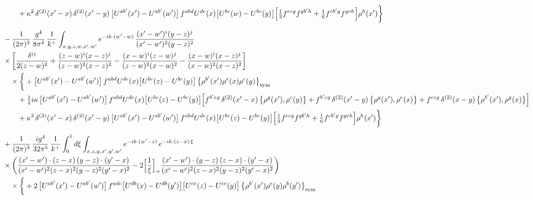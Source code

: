 \documentclass[10pt]{article}
\numberwithin{equation}{section}
\begin{document}
\begin{align}
&\qquad+\kappa^{2}\,\delta^{(2)}(x^{\prime}-x)\,\delta^{(2)}(x^{\prime}-y)\,\big[U^{ab^{\prime}}(x^{\prime})-U^{ab^{\prime}}(w^{\prime})\big]\,f^{abd}U^{de}(x)\big[U^{bc}(w)-U^{bc}(y)\big]\Big[\tfrac13f^{ecg}f^{gb^{\prime}h}+\tfrac16f^{cb^{\prime}g}f^{geh}\Big]\rho^{h}(x^{\prime})\bigg\}\notag\\[6pt]
&-\frac{1}{(2\pi)^{3}}\,\frac{g^{4}}{8\pi^{4}}\,\frac{1}{k^{+}}\int_{x,y,z,w,x^{\prime},w^{\prime}}e^{-ik\cdot(w^{\prime}-w)}\,\frac{(x^{\prime}-w^{\prime})^{i}(y-z)^{j}}{(x^{\prime}-w^{\prime})^{2}(y-z)^{2}}\notag\\
&\times\bigg[\frac{\delta^{ij}}{2(z-w)^{2}}+\frac{(z-w)^{i}(x-z)^{j}}{(z-w)^{2}(x-z)^{2}}-\frac{(x-w)^{i}(z-w)^{j}}{(z-w)^{2}(x-w)^{2}}-\frac{(x-w)^{i}(x-z)^{j}}{(x-w)^{2}(x-z)^{2}}\bigg]\notag\\
&\quad\times\bigg\{+\big[U^{ab^{\prime}}(x^{\prime})-U^{ab^{\prime}}(w^{\prime})\big]\,f^{abd}U^{de}(x)\big[U^{bc}(z)-U^{bc}(y)\big]\,\big\{\rho^{b^{\prime}}(x^{\prime})\rho^{e}(x)\rho^{c}(y)\big\}_{\rm sym}\notag\\
&\qquad+\tfrac14 i\kappa\,\big[U^{ab^{\prime}}(x^{\prime})-U^{ab^{\prime}}(w^{\prime})\big]\,f^{abd}U^{de}(x)\big[U^{bc}(z)-U^{bc}(y)\big]\Big[f^{b^{\prime}eg}\,\delta^{(2)}(x^{\prime}-x)\,\big\{\rho^{g}(x^{\prime}),\rho^{c}(y)\big\}+f^{b^{\prime}cg}\,\delta^{(2)}(x^{\prime}-y)\,\big\{\rho^{g}(x^{\prime}),\rho^{e}(x)\big\}+f^{ecg}\,\delta^{(2)}(x-y)\,\big\{\rho^{b^{\prime}}(x^{\prime}),\rho^{g}(x)\big\}\Big]\notag\\
&\qquad+\kappa^{2}\,\delta^{(2)}(x^{\prime}-x)\,\delta^{(2)}(x^{\prime}-y)\,\big[U^{ab^{\prime}}(x^{\prime})-U^{ab^{\prime}}(w^{\prime})\big]\,f^{abd}U^{de}(x)\big[U^{bc}(z)-U^{bc}(y)\big]\Big[\tfrac13f^{ecg}f^{gb^{\prime}h}+\tfrac16f^{cb^{\prime}g}f^{geh}\Big]\rho^{h}(x^{\prime})\bigg\}\notag\\[6pt]
&+\frac{1}{(2\pi)^{3}}\,\frac{ig^{4}}{32\pi^{5}}\,\frac{1}{k^{+}}\int_{0}^{1}d\xi\int_{x,z,y,x^{\prime},y^{\prime},w^{\prime}}e^{-ik\cdot(w^{\prime}-z)}\,e^{-ik\cdot(z-x)\,\xi}\notag\\
&\times\bigg(\frac{(x^{\prime}-w^{\prime})\cdot(z-x)\,(y-z)\cdot(y^{\prime}-x)}{(x^{\prime}-w^{\prime})^{2}(z-x)^{2}(y-z)^{2}(y^{\prime}-x)^{2}}-2\Big[\frac{1}{\xi}\Big]_{+}\frac{(x^{\prime}-w^{\prime})\cdot(y-z)\,(z-x)\cdot(y^{\prime}-x)}{(x^{\prime}-w^{\prime})^{2}(z-x)^{2}(y-z)^{2}(y^{\prime}-x)^{2}}\bigg)\notag\\
&\quad\times\bigg\{+2\,\big[U^{ab^{\prime}}(x^{\prime})-U^{ab^{\prime}}(w^{\prime})\big]\,f^{adc}\big[U^{db}(x)-U^{db}(y^{\prime})\big]\big[U^{ce}(z)-U^{ce}(y)\big]\,\big\{\rho^{b^{\prime}}(x^{\prime})\rho^{e}(y)\rho^{b}(y^{\prime})\big\}_{\rm sym}\notag\\

\end{align}
\end{document}
